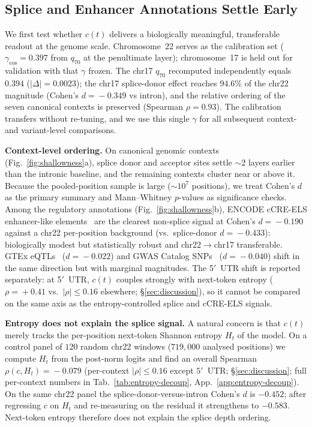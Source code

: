 \documentclass{article}
\theoremstyle{plain}
\theoremstyle{definition}
\theoremstyle{remark}
\begin{document}
\subsection{Splice and Enhancer Annotations Settle Early}
\label{sec:shallowness}

We first test whether $c(t)$ delivers a biologically meaningful, transferable readout at the genome scale. Chromosome~22 serves as the calibration set ($\gamma_{\cos}\!=\!0.397$ from $q_{70}$ at the penultimate layer); chromosome~17 is held out for validation with that $\gamma$ frozen. The chr17 $q_{70}$ recomputed independently equals $0.394$ ($|\Delta|\!=\!0.0023$); the chr17 splice-donor effect reaches $94.6\%$ of the chr22 magnitude (Cohen's $d\!=\!-0.349$ vs intron), and the relative ordering of the seven canonical contexts is preserved (Spearman $\rho\!=\!0.93$). The calibration transfers without re-tuning, and we use this single $\gamma$ for all subsequent context- and variant-level comparisons.

\textbf{Context-level ordering.} On canonical genomic contexts (Fig.~\ref{fig:shallowness}a), splice donor and acceptor sites settle $\sim 2$ layers earlier than the intronic baseline, and the remaining contexts cluster near or above it. Because the pooled-position sample is large ($\sim\!10^7$ positions), we treat Cohen's $d$ as the primary summary and Mann--Whitney $p$-values as significance checks. Among the regulatory annotations (Fig.~\ref{fig:shallowness}b), ENCODE cCRE-ELS enhancer-like elements~\cite{moore2020encode} are the clearest non-splice signal at Cohen's $d\!=\!-0.190$ against a chr22 per-position background (vs.\ splice-donor $d\!=\!-0.433$): biologically modest but statistically robust and chr22$\to$chr17 transferable. GTEx eQTLs~\cite{gtex2020} ($d\!=\!-0.022$) and GWAS Catalog SNPs~\cite{sollis2023gwas} ($d\!=\!-0.040$) shift in the same direction but with marginal magnitudes. The 5$'$~UTR shift is reported separately: at 5$'$~UTR, $c(t)$ couples strongly with next-token entropy ($\rho\!=\!+0.41$ vs.\ $|\rho|\!\le\!0.16$ elsewhere; \S\ref{sec:discussion}), so it cannot be compared on the same axis as the entropy-controlled splice and cCRE-ELS signals.

\textbf{Entropy does not explain the splice signal.} A natural concern is that $c(t)$ merely tracks the per-position next-token Shannon entropy $H_t$ of the model. On a control panel of $120$ random chr22 windows ($719{,}000$ analysed positions) we compute $H_t$ from the post-norm logits and find an overall Spearman $\rho(c, H_t)\!=\!-0.079$ (per-context $|\rho|\!\le\!0.16$ except $5'$~UTR; \S\ref{sec:discussion}; full per-context numbers in Tab.~\ref{tab:entropy-decoup}, App.~\ref{app:entropy-decoup}). On the same chr22 panel the splice-donor-versus-intron Cohen's $d$ is $-0.452$; after regressing $c$ on $H_t$ and re-measuring on the residual it strengthens to $-0.583$. Next-token entropy therefore does not explain the splice depth ordering.
\end{document}
